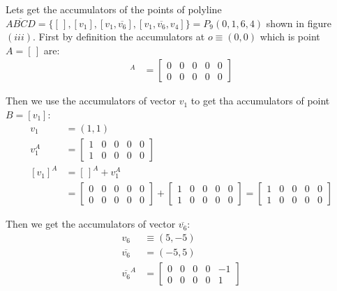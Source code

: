 \documentclass[11pt]{article}
\begin{document}
Lets get the accumulators of the points of polyline $\overline{ABCD} = \{[\hspace{2pt}], [v_1], [v_1,\overline{v_6}], [v_1,\overline{v_6},v_4]\} = P_9(0,1,6,4)$ shown in figure $(iii)$. First by definition the accumulators at $o \equiv (0,0)$ which is point $A=[\hspace{2pt}]$ are:
\begin{align}
[\hspace{2pt}]^A &= \left[\begin{array}{ccccc}0&0&0&0&0 \\ 0&0&0&0&0 \end{array}\right]
\end{align}

Then we use the accumulators of vector $v_1$ to get tha accumulators of point $B=[v_1]$:
\begin{align}
v_1 &= (1,1) \nonumber\\
v_1^A &= \left[\begin{array}{ccccc}1&0&0&0&0 \\ 1&0&0&0&0 \end{array}\right]\nonumber\\
[v_1]^A &= [\hspace{2pt}]^A + v_1^A\nonumber\\
 &= \left[\begin{array}{ccccc}0&0&0&0&0 \\ 0&0&0&0&0 \end{array}\right]
 + \left[\begin{array}{ccccc}1&0&0&0&0 \\ 1&0&0&0&0 \end{array}\right]
 = \left[\begin{array}{ccccc}1&0&0&0&0 \\ 1&0&0&0&0 \end{array}\right]
\end{align}

Then we get the accumulators of vector $\overline{v_6}$:
\begin{align}
v_6 &\equiv (5,-5)\nonumber\\
\overline{v_6} &= (-5,5)\nonumber\\
\overline{v_6}^A &= \left[\begin{array}{ccccc}0&0&0&0&-1 \\ 0&0&0&0&1 \end{array}\right]
\end{align}
\end{document}
